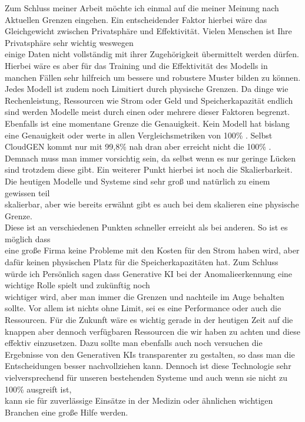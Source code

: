 Zum Schluss meiner Arbeit möchte ich einmal auf die meiner Meinung nach \\ Aktuellen Grenzen eingehen. Ein entscheidender Faktor hierbei wäre das Gleichgewicht zwischen Privatsphäre und Effektivität. Vielen Menschen ist Ihre Privatsphäre sehr wichtig weswegen \\ einige Daten nicht vollständig mit ihrer Zugehörigkeit übermittelt werden dürfen. Hierbei wäre es aber für das Training und die Effektivität des Modells in manchen Fällen sehr hilfreich um bessere und robustere Muster bilden zu können. Jedes Modell ist zudem noch Limitiert durch physische Grenzen. Da dinge wie Rechenleistung, Ressourcen wie Strom oder Geld und Speicherkapazität endlich sind werden Modelle meist durch einen oder mehrere dieser Faktoren begrenzt. Ebenfalls ist eine momentane Grenze die Genauigkeit. Kein Modell hat bislang eine Genauigkeit oder werte in allen Vergleichsmetriken von 100\% . Selbst CloudGEN kommt nur mit 99,8\% nah dran aber erreicht nicht die 100\% . Demnach muss man immer vorsichtig sein, da selbst wenn es nur geringe Lücken sind trotzdem diese gibt. Ein weiterer Punkt hierbei ist noch die Skalierbarkeit. \\ Die heutigen Modelle und Systeme sind sehr groß und natürlich zu einem gewissen teil \\ skalierbar, aber wie bereits erwähnt gibt es auch bei dem skalieren eine physische Grenze. \\ Diese ist an verschiedenen Punkten schneller erreicht als bei anderen. So ist es möglich dass \\ eine große Firma keine Probleme mit den Kosten für den Strom haben wird, aber dafür keinen physischen Platz für die Speicherkapazitäten hat. Zum Schluss würde ich Persönlich sagen dass Generative KI bei der Anomalieerkennung eine wichtige Rolle spielt und zukünftig noch \\ wichtiger wird, aber man immer die Grenzen und nachteile im Auge behalten sollte. Vor allem ist nichts ohne Limit, sei es eine Performance oder auch die Ressourcen. Für die Zukunft wäre es wichtig gerade in der heutigen Zeit auf die knappen aber dennoch verfügbaren Ressourcen die wir haben zu achten und diese effektiv einzusetzen. Dazu sollte man ebenfalls auch noch versuchen die Ergebnisse von den Generativen KIs transparenter zu gestalten, so dass man die  \\Entscheidungen besser nachvollziehen kann. Dennoch ist diese Technologie sehr vielversprechend für unseren bestehenden Systeme und auch wenn sie nicht zu 100\% ausgreift ist, \\ kann sie für zuverlässige Einsätze in der Medizin oder ähnlichen wichtigen Branchen eine große Hilfe werden.    
